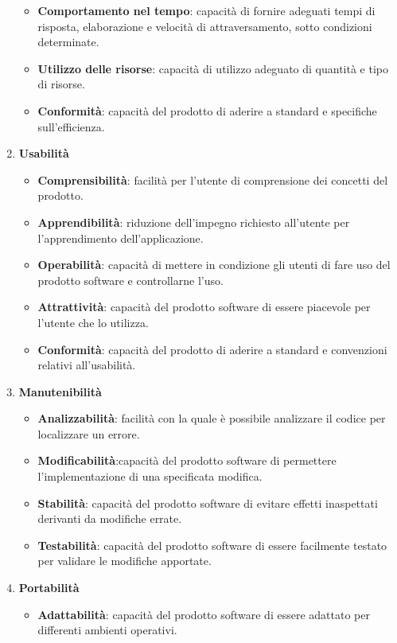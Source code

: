 \begin{enumerate}
	\begin{itemize}
		\item \textbf{Comportamento nel tempo}: capacità di fornire adeguati tempi di risposta, elaborazione e velocità di attraversamento, 
		sotto condizioni determinate.
		\item \textbf{Utilizzo delle risorse}: capacità di utilizzo adeguato di quantità e tipo di risorse.
		\item \textbf{Conformità}: capacità del prodotto di aderire a standard e specifiche\\ sull'efficienza.
	\end{itemize}
	\item \textbf{Usabilità}
	\begin{itemize}
		\item \textbf{Comprensibilità}: facilità per l'utente di comprensione dei concetti del prodotto.
		\item \textbf{Apprendibilità}: riduzione dell'impegno richiesto all'utente per l'apprendimento dell'applicazione.
		\item \textbf{Operabilità}: capacità di mettere in condizione gli utenti di fare uso del prodotto software e controllarne l'uso.
		\item \textbf{Attrattività}: capacità del prodotto software di essere piacevole per l'utente che lo utilizza.
		\item \textbf{Conformità}: capacità del prodotto di aderire a standard e convenzioni relativi all'usabilità.
	\end{itemize}
	\item \textbf{Manutenibilità}
	\begin{itemize}
		\item \textbf{Analizzabilità}: facilità con la quale è possibile analizzare il codice per localizzare un errore.
		\item \textbf{Modificabilità}:capacità del prodotto software di permettere l'implementazione di una specificata modifica.
		\item \textbf{Stabilità}: capacità del prodotto software di evitare effetti inaspettati derivanti da modifiche errate.
		\item \textbf{Testabilità}: capacità del prodotto software di essere facilmente testato per validare le modifiche apportate.
	\end{itemize}
	\item \textbf{Portabilità}
	\begin{itemize}
		\item \textbf{Adattabilità}: capacità del prodotto software di essere adattato per differenti ambienti operativi.

\end{itemize}
\end{enumerate}
